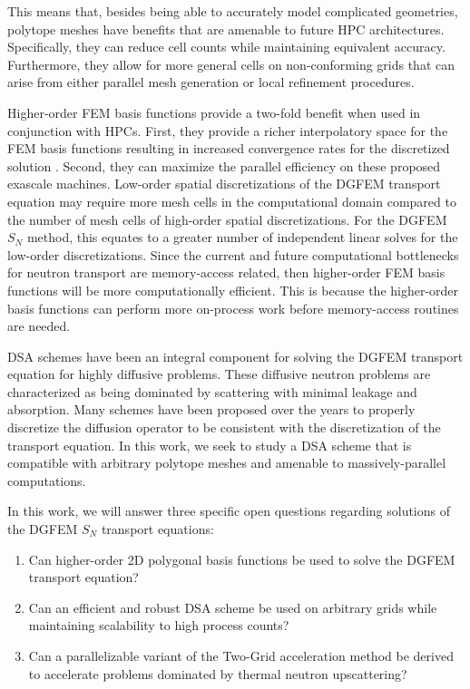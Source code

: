 \noindent This means that, besides being able to accurately model complicated geometries, polytope meshes have benefits that are amenable to future HPC architectures. Specifically, they can reduce cell counts while maintaining equivalent accuracy. Furthermore, they allow for more general cells on non-conforming grids that can arise from either parallel mesh generation or local refinement procedures.

Higher-order FEM basis functions provide a two-fold benefit when used in conjunction with HPCs. First, they provide a richer interpolatory space for the FEM basis functions resulting in increased convergence rates for the discretized solution \cite{ern2013theory}. Second, they can maximize the parallel efficiency on these proposed exascale machines. Low-order spatial discretizations of the DGFEM transport equation may require more mesh cells in the computational domain compared to the number of mesh cells of high-order spatial discretizations. For the DGFEM $S_N$ method, this equates to a greater number of independent linear solves for the low-order discretizations. Since the current and future computational bottlenecks for neutron transport are memory-access related, then higher-order FEM basis functions will be more computationally efficient. This is because the higher-order basis functions can perform more on-process work before memory-access routines are needed.

DSA schemes have been an integral component for solving the DGFEM transport equation for highly diffusive problems. These diffusive neutron problems are characterized as being dominated by scattering with minimal leakage and absorption. Many schemes have been proposed over the years to properly discretize the diffusion operator to be consistent with the discretization of the transport equation. In this work, we seek to study a DSA scheme that is compatible with arbitrary polytope meshes and amenable to massively-parallel computations.

In this work, we will answer three specific open questions regarding solutions of the DGFEM $S_N$ transport equations:

\begin{enumerate}
\item Can higher-order 2D polygonal basis functions be used to solve the DGFEM transport equation?
\item Can an efficient and robust DSA scheme be used on arbitrary grids while maintaining scalability to high process counts?
\item Can a parallelizable variant of the Two-Grid acceleration method be derived to accelerate problems dominated by thermal neutron upscattering?
\end{enumerate}


